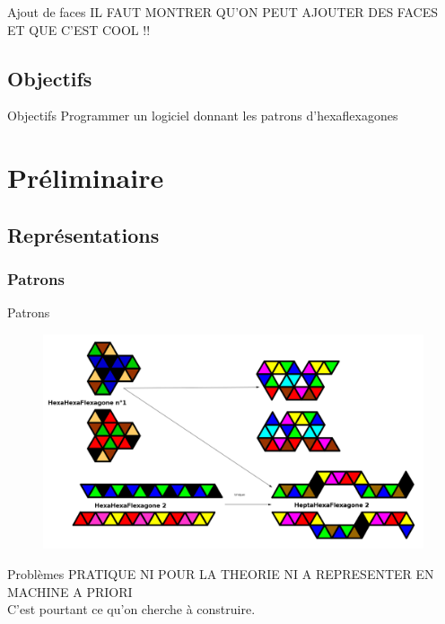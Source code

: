 \documentclass[french,xcolor=dvipsnames]{beamer}
\begin{document}
		\begin{frame}{Ajout de faces}
		IL FAUT MONTRER QU'ON PEUT AJOUTER DES FACES ET QUE C'EST COOL !!
		\end{frame}
		
		\subsection{Objectifs}
		\begin{frame}{Objectifs}
			Programmer un logiciel donnant les patrons d'hexaflexagones
		\end{frame}
		
		
	\section{Préliminaire}
	
		\subsection{Représentations}
		
		\subsubsection{Patrons}
		\begin{frame}{Patrons}
			\begin{figure}
				\includegraphics[scale=0.19]{exemples_patrons.png}
			\end{figure}
		\end{frame}
		
		\begin{frame}{Problèmes}
			PRATIQUE NI POUR LA THEORIE NI A REPRESENTER EN MACHINE A PRIORI\\
			C'est pourtant ce qu'on cherche à construire.
		\end{frame}
				
\end{document}
